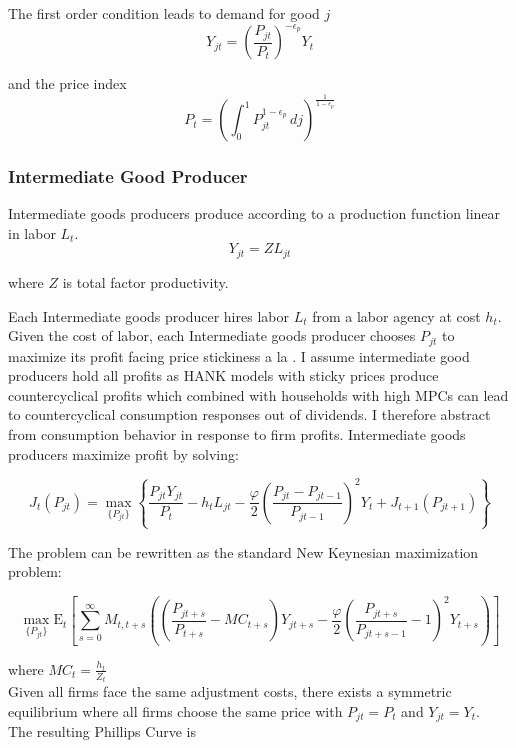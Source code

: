 \documentclass[\econtexRoot/HAFiscal]{subfiles}
\begin{document}
The first order condition leads to demand for good $j$
$$Y_{jt} = \left(\frac {P_{jt}}{P_{t}}\right)^{- \epsilon_{p}} Y_{t}$$

and the price index
$$P_{t} = \left(\int_{0}^{1} P_{jt}^{1-\epsilon_{p}}\,dj \right )^{\frac{1}{1-\epsilon_{p}}}$$


\subsubsection{Intermediate Good Producer}

Intermediate goods producers produce according to a production function linear in labor $L_{t}$. 
$$Y_{jt} =  Z  L_{jt}$$ 

where $Z$ is total factor productivity.
\vspace{.3cm}
  
 Each Intermediate goods producer hires labor $L_{t}$ from a labor agency at cost $h_{t}$. 
 Given the cost of labor, each Intermediate goods producer chooses $P_{jt}$ to maximize its profit facing price stickiness a la \cite{Rotemberg1982}. I assume intermediate good producers hold all profits as HANK models with sticky prices produce countercyclical profits which combined with households with high MPCs can lead to countercyclical consumption responses out of dividends. I therefore abstract from consumption behavior in response to firm profits. Intermediate goods producers maximize profit by solving:
 
$$J_{t}\left(P_{jt}\right) = \max_{\{P_{jt}\}} \left\{\frac{P_{jt}Y_{jt}}{P_{t}} - h_{t} L_{jt} -  \frac{\varphi}{2}\left( \frac{P_{jt} - P_{jt-1}}{P_{jt-1}} \right)^{2} Y_{t}  + J_{t+1}\left(P_{jt+1}\right) \right\}$$ 

The problem can be rewritten as the standard New Keynesian maximization problem:

$$\max_{\{P_{jt}\}} \mathrm{E}_{t}\left[\sum_{s=0}^{\infty}  M_{t,t+s} \left( \left( \frac{P_{jt+s}}{P_{t+s}} - MC_{t+s}\right)Y_{jt+s} -  \frac{\varphi}{2}\left( \frac{P_{jt+s}}{P_{jt+s-1}} - 1\right)^{2} Y_{t+s} \right)\right]$$ 


where $MC_{t} = \frac{h_{t}}{Z_{t}}  $ \\



Given all firms face the same adjustment costs, there exists a symmetric equilibrium where all firms choose the same price with $P_{jt} =P_{t}$ and $Y_{jt} =Y_{t}$.\\ 

The resulting Phillips Curve is
\end{document}
